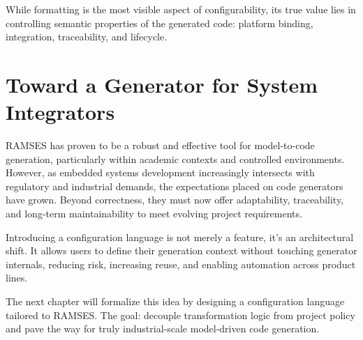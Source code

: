 \begin{tcolorbox}[colback=blue!5, colframe=blue!50!black, title=Configuration is More Than Style]
	While formatting is the most visible aspect of configurability, its true value lies in controlling semantic properties of the generated code: platform binding, integration, traceability, and lifecycle.
\end{tcolorbox}

\section{Toward a Generator for System Integrators}
\label{sec:conclusion_configurable_generation}

RAMSES has proven to be a robust and effective tool for model-to-code generation, particularly within academic contexts and controlled environments. However, as embedded systems development increasingly intersects with regulatory and industrial demands, the expectations placed on code generators have grown. Beyond correctness, they must now offer adaptability, traceability, and long-term maintainability to meet evolving project requirements.

Introducing a configuration language is not merely a feature, it's an architectural shift. It allows users to define their generation context without touching generator internals, reducing risk, increasing reuse, and enabling automation across product lines.

The next chapter will formalize this idea by designing a configuration language tailored to RAMSES. The goal: decouple transformation logic from project policy and pave the way for truly industrial-scale model-driven code generation.


